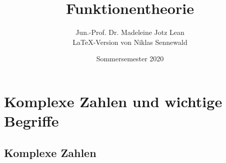 \documentclass[a4paper,12pt]{article}
\title{\Huge \textbf{Funktionentheorie}}
\author{Jun.-Prof. Dr. Madeleine Jotz Lean\\\LaTeX{}-Version von Niklas Sennewald}
\date{Sommersemester 2020}
\theoremstyle{newthm}
\theoremstyle{newdef}
\theoremstyle{newrem}
\begin{document}
	\maketitle
		 \setcounter{page}{0}
	\vspace{\fill}
	\renewcommand{\abstractname}{Disclaimer}
	\tableofcontents
	\thispagestyle{empty}
		\newpage
	
	\setcounter{page}{1}
	\setcounter{section}{-1}	


\section[Einführung]{Komplexe Zahlen und wichtige Begriffe}
	
	\subsection{Komplexe Zahlen}
		
\end{document}
